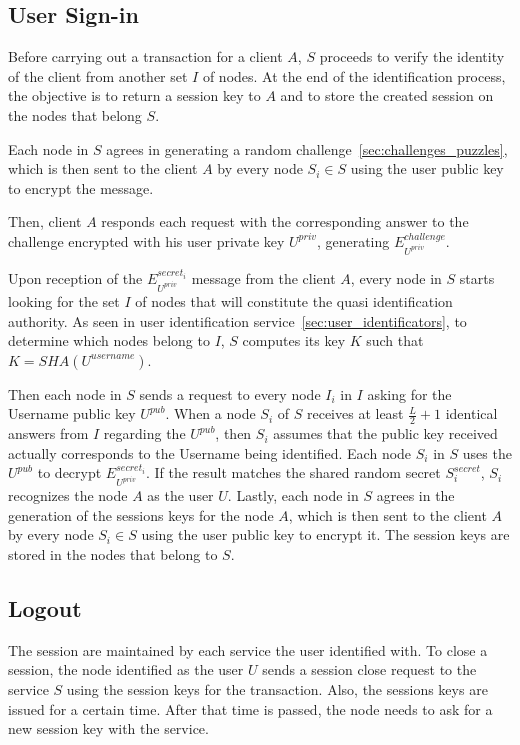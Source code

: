 \subsection{User Sign-in}

Before carrying out a transaction for a client $A$, $S$ proceeds to
verify the identity of the client from another set $I$ of nodes. At the end of
the identification process, the objective is to return a session key to $A$
and to store the created session on the nodes that belong $S$.

Each node in $S$ agrees in generating a random challenge~\ref{sec:challenges_puzzles}, which is then sent to the
client $A$ by every node $S_i \in S$ using the user public key to encrypt the
message.

Then, client $A$ responds each request with the corresponding answer to the
challenge encrypted with his user private key $U^{priv}$, generating
$E^{challenge}_{U^{priv}}$. 

Upon reception of the $E^{secret_i}_{U^{priv}}$ message from the client $A$, every node in $S$
starts looking for the set $I$ of nodes that will constitute the quasi
identification authority. As seen in user identification service~\ref{sec:user_identificators}, to
determine which nodes belong to $I$, $S$ computes
its key $K$ such that $K = SHA(U^{username})$.

Then each node in $S$ sends a request to every node $I_i$ in $I$ asking for the Username public key $U^{pub}$. When a node
$S_i$ of $S$ receives at least $\frac{L}{2} + 1$ identical answers from
$I$ regarding the $U^{pub}$, then $S_i$ assumes that the public key received
actually corresponds to the Username being identified. Each node $S_i$ in $S$
uses the $U^{pub}$ to decrypt $E^{secret_i}_{U^{priv}}$. If the result matches
the shared random secret $S^{secret}_i$, $S_i$ recognizes the node $A$ as the
user $U$.
Lastly, each node in $S$ agrees in the generation of the sessions keys for the
node $A$, which is then sent to the client $A$ by every node $S_i \in S$ using
the user public key to encrypt it. The session keys are stored in the
nodes that belong to $S$.

\subsection{Logout}
The session are maintained by each service the user identified with. To close a
session, the node identified as the user $U$ sends a session close request to
the service $S$ using the session keys for the transaction. Also, the sessions
keys are issued for a certain time. After that time is passed, the node needs
to ask for a new session key with the service.


